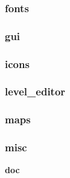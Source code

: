 \documentclass[a4paper]{article}
\begin{document}
\clearpage\subsubsection[fonts]{fonts}
\hypertarget{RefHeading19631167907073}{}\subsubsection{}
\clearpage\subsubsection[gui]{gui}
\hypertarget{RefHeading19651167907073}{}\subsubsection{}
\clearpage\subsubsection[icons]{icons}
\hypertarget{RefHeading19671167907073}{}\subsubsection{}
\clearpage\subsubsection[level\_editor]{level\_editor}
\hypertarget{RefHeading19691167907073}{}\subsubsection{}
\clearpage\subsubsection[maps]{maps}
\hypertarget{RefHeading19711167907073}{}\subsubsection{}
\clearpage\subsubsection[misc]{misc}
\hypertarget{RefHeading19731167907073}{}\clearpage
\bigskip


\bigskip


\bigskip

{\centering\sffamily\bfseries
\hypertarget{RefHeading19751167907073}{}doc
\par}
\end{document}
